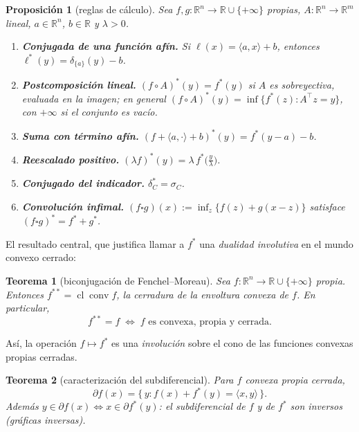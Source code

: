 \documentclass[12pt]{book}
\newcommand{\R}{\mathbb{R}}
\newcommand{\cl}{\operatorname{cl}}
\newcommand{\subdiff}{\partial}
\newcommand{\indic}{\delta}
\newcommand{\supp}{\sigma}
\theoremstyle{definition}
\theoremstyle{plain}
\newtheorem{proposicion}{Proposición}[section]
\newtheorem{teorema}{Teorema}[section]
\theoremstyle{remark}
\begin{document}
\begin{proposicion}[reglas de cálculo]
  Sea $f,g:\R^n\to\R\cup\{+\infty\}$ propias, $A:\R^n\to\R^m$ lineal,
  $a\in\R^n$, $b\in\R$ y $\lambda>0$.
  \begin{enumerate}[label=\textup{(\alph*)},leftmargin=1.8em,itemsep=2pt]
    \item \textbf{Conjugada de una función afín.}
          Si $\ell(x)=\langle a,x\rangle+b$, entonces
          $\ell^*(y)=\indic_{\{a\}}(y)-b$.
    \item \textbf{Postcomposición lineal.}
          $(f\circ A)^*(y)=f^*(y)$ si $A$ es sobreyectiva, evaluada en
          la imagen; en general
          $(f\circ A)^*(y)=\inf\{f^*(z):A^{\!\top} z=y\}$,
          con $+\infty$ si el conjunto es vacío.
    \item \textbf{Suma con término afín.}
          $(f+\langle a,\cdot\rangle+b)^*(y)=f^*(y-a)-b$.
    \item \textbf{Reescalado positivo.}
          $(\lambda f)^*(y)=\lambda\, f^*\!\bigl(\tfrac{y}{\lambda}\bigr)$.
    \item \textbf{Conjugado del indicador.}
          $\indic_C^* = \supp_C$.
    \item \textbf{Convolución infimal.}
          $(f\square g)(x):=\inf_{z}\{f(z)+g(x-z)\}$
          satisface $(f\square g)^*=f^*+g^*$.
  \end{enumerate}
\end{proposicion}

El resultado central, que justifica llamar a $f^*$ una
\emph{dualidad involutiva} en el mundo convexo cerrado:

\begin{teorema}[biconjugación de Fenchel--Moreau]
  Sea $f:\R^n\to\R\cup\{+\infty\}$ propia.  Entonces
  $f^{**}=\cl\operatorname{conv} f$, la cerradura de la envoltura
  convexa de $f$.  En particular,
  \[
    \boxed{\; f^{**}=f \;\Longleftrightarrow\; f \text{ es convexa, propia y cerrada.} \;}
  \]
\end{teorema}

Así, la operación $f\mapsto f^*$ es una \emph{involución} sobre el
cono de las funciones convexas propias cerradas.

\begin{teorema}[caracterización del subdiferencial]
  Para $f$ convexa propia cerrada,
  \[
    \subdiff f(x)=\{\, y : f(x)+f^*(y)=\langle x,y\rangle\,\}.
  \]
  Además $y\in\subdiff f(x)\Leftrightarrow x\in\subdiff f^*(y)$:
  el subdiferencial de $f$ y de $f^*$ son inversos (gráficas inversas).
\end{teorema}
\end{document}
